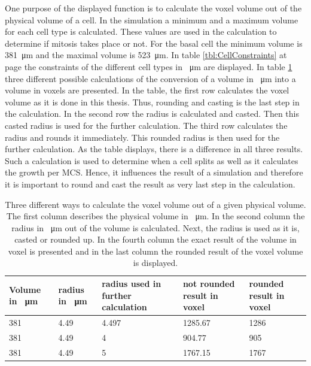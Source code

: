 One purpose of the displayed function is to calculate the voxel volume out of the physical volume of a cell. In the simulation a minimum and a maximum volume for each cell type is calculated. These values are used in the calculation to determine if mitosis takes place or not. \newline
For the basal cell the minimum volume is \SI{381}{\micro\metre} and the maximal volume is \SI{523}{\micro\metre}. In table \ref{tbl:CellConstraints} at page \pageref{tbl:CellConstraints} the constraints of the different cell types in \SI{}{\micro\metre} are displayed. In table \ref{tbl:Approximation error3D} three different possible calculations of the conversion of a volume in \SI{}{\micro\metre} into a volume in voxels are presented.
In the table, the first row calculates the voxel volume as it is done in this thesis. Thus, rounding and casting is the last step in the calculation. In the second row the radius is calculated and casted. Then this casted radius is used for the further calculation. The third row calculates the radius and rounds it immediately. This rounded radius is then used for the further calculation. \newline
As the table displays, there is a difference in all three results. Such a calculation is used to determine when a cell splits as well as it calculates the growth per \ac{MCS}. Hence, it influences the result of a simulation and therefore it is important to round and cast the result as very last step in the calculation.

\begin{table}[H]
\centering
\caption[Different calculations of the convertion of a physical unit into the voxel unit]{Three different ways to calculate the voxel volume out of a given physical volume. The first column describes the physical volume in \SI{}{\micro\metre}. In the second column the radius in \SI{}{\micro\metre} out of the volume is calculated. Next, the radius is used as it is, casted or rounded up. In the fourth column the exact result of the volume in voxel is presented and in the last column the rounded result of the voxel volume is displayed. \newline}
\renewcommand{\arraystretch}{1.5}
	\begin{tabularx}{\textwidth}{|X|X|X|X|X|}
	\hline
		Volume in \SI{}{\micro\metre} & radius in \SI{}{\micro\metre} & radius used in further calculation & not rounded result in voxel & rounded result in voxel  \\
		\hline
		\hline
		381 & 4.49 & 4.497 & 1285.67 & 1286 \\
		\hline
		381 & 4.49 & 4 & 904.77 & 905\\
		\hline
		381 & 4.49 & 5 & 1767.15 & 1767
\tabularnewline
\hline 
	\end{tabularx}
	\label{tbl:Approximation error3D}
\end{table}


